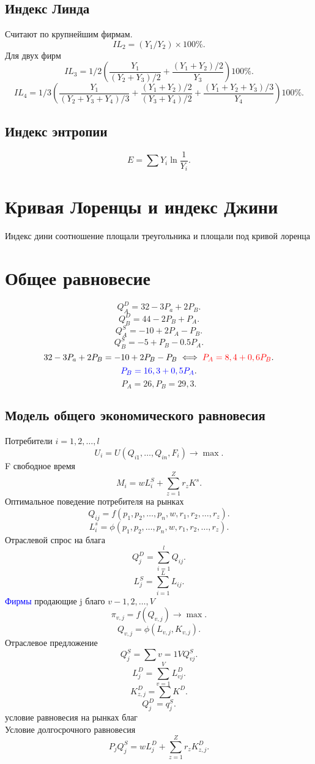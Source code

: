 \documentclass[14pt]{extarticle}
\begin{document}
\subsection{Индекс Линда}
Считают по крупнейшим фирмам.
\[
IL_{2} = (Y_1/ Y_2) \times 100\%
.\] 
Для двух фирм
\[
IL_3 = 1/2 (\frac{Y_1}{(Y_2 + Y_3) / 2} + \frac{(Y_1 + Y_2)/2}{Y_3}) 100\%
.\] 
\[
IL_4 = 1/3 (\frac{Y_1}{(Y_2 + Y_3 + Y_4)/3} + \frac{(Y_1 + Y_2)/2}{(Y_3 + Y_4)/2}
+ \frac{(Y_1 + Y_2 + Y_3)/3}{Y_4}) 100\%
.\] 
\subsection{Индекс энтропии}
\[
    E = \sum Y_{i} \ln{\frac{1}{Y_{i}}}
.\] 
\section{Кривая Лоренцы и индекс Джини}
Индекс дини соотношение площали треугольника и площали под кривой лоренца
\section{Общее равновесие}
\[
Q_{A}^{D} = 32 - 3P_{a} + 2P_{B}
.\] 
\[
Q_{B}^{D} = 44 - 2P_{B} + P_{A}
.\] 
\[
Q_{A}^{S} = -10 + 2P_{A} - P_{B}
.\] 
\[
Q_{B}^{S} = -5 + P_{B} - 0.5P_{A}
.\] 
\[
    32 - 3P_{a} + 2P_{B} = -10 + 2P_{B} - P_{B} \iff \textcolor{red}{P_{A} = 8,4 + 0,6 P_{B}}
.\] 
\[
    \textcolor{blue}{ P_{B} = 16,3 + 0,5P_{A}
}.\] 
\[
P_{A} = 26,P_{B} = 29,3
.\] 
\subsection{Модель общего экономического равновесия}
Потребители $i = 1,2,\dots,l$
 \[
U_{i} = U(Q_{i1} , \dots,Q_{in},F_{i}) \to \max
.\] 
F свободное время
\[
M_{i} = wL_{i}^{S} + \sum_{z = 1}^{Z} r_{z} K^{s}
.\] 
Оптимальное поведение потребителя на рынках
\[
Q_{ij} = f(p_1,p_2,\dots,p_{n},w,r_1,r_2,\dots,r_{z})
.\] 
\[
L_{i}^{s} = \phi (p_1,p_2,\dots,p_{n},w,r_1,r_2,\dots,r_{z})
.\] 
Отраслевой спрос на блага
\[
Q_{j}^{D} = \sum_{i =1 }^{l} Q_{ij}
.\] 
\[
L_{j}^{S} = \sum_{i =1}^{L} L_{ij}
.\] 
\textcolor{blue}{Фирмы} продающие j благо $v - 1,2,\dots,V$
\[
\pi_{v,j} = f(Q_{v,j}) \to \max
.\] 
\[
Q_{v,j} = \phi(L_{v,j},K_{v,j})
.\] 
Отраслевое предложение
\[
    Q_{j}^{S} = \sum\limits{v=1}{V} Q^{S}_{vj}
.\] 
\[
    L_{j}^{D} = \sum_{v =1}^{V} L^{D}_{vj}
.\] 
\[
K_{z,j}^{D}= \sum K^{D}
.\] 
\[
Q_{j}^{D} = q_{j}^{S}
.\] 
условие равновесия на рынках благ\\
Условие долгосрочного равновесия
\[
P_{j}Q_{j}^{S} = wL_{j}^{D} + \sum_{z=1}^{Z}r_{z}K_{z,j}^{D}
.\] 
\end{document}
